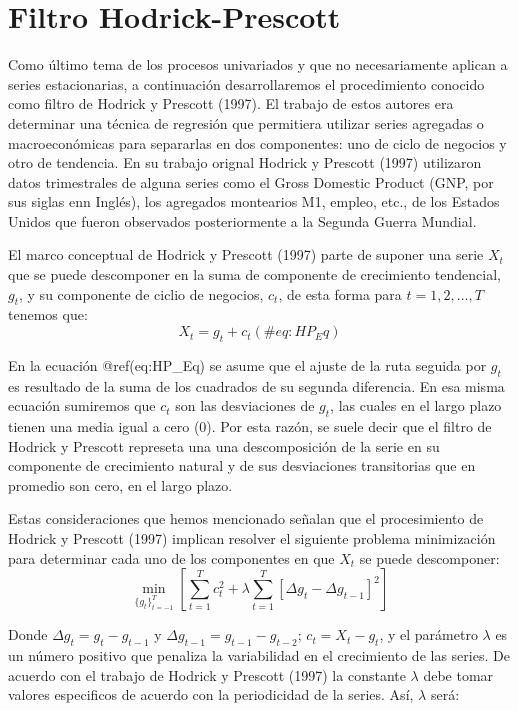 \documentclass[
]{book}
\begin{document}
\hypertarget{filtro-hodrick-prescott}{%
\section{Filtro Hodrick-Prescott}\label{filtro-hodrick-prescott}}

Como último tema de los procesos univariados y que no necesariamente aplican a series estacionarias, a continuación desarrollaremos el procedimiento conocido como filtro de Hodrick y Prescott (1997). El trabajo de estos autores era determinar una técnica de regresión que permitiera utilizar series agregadas o macroeconómicas para separarlas en dos componentes: uno de ciclo de negocios y otro de tendencia. En su trabajo orignal Hodrick y Prescott (1997) utilizaron datos trimestrales de alguna series como el Gross Domestic Product (GNP, por sus siglas enn Inglés), los agregados montearios M1, empleo, etc., de los Estados Unidos que fueron observados posteriormente a la Segunda Guerra Mundial.

El marco conceptual de Hodrick y Prescott (1997) parte de suponer una serie \(X_t\) que se puede descomponer en la suma de componente de crecimiento tendencial, \(g_t\), y su componente de ciclio de negocios, \(c_t\), de esta forma para \(t = 1, 2, \ldots, T\) tenemos que:
\begin{equation}
    X_t = g_t + c_t
    (\#eq:HP_Eq)
\end{equation}

En la ecuación @ref(eq:HP\_Eq) se asume que el ajuste de la ruta seguida por \(g_t\) es resultado de la suma de los cuadrados de su segunda diferencia. En esa misma ecuación sumiremos que \(c_t\) son las desviaciones de \(g_t\), las cuales en el largo plazo tienen una media igual a cero (0). Por esta razón, se suele decir que el filtro de Hodrick y Prescott represeta una una descomposición de la serie en su componente de crecimiento natural y de sus desviaciones transitorias que en promedio son cero, en el largo plazo.

Estas consideraciones que hemos mencionado señalan que el procesimiento de Hodrick y Prescott (1997) implican resolver el siguiente problema minimización para determinar cada uno de los componentes en que \(X_t\) se puede descomponer:
\begin{equation}
    \min_{\{ g_t \}^T_{t = -1} } \left[ \sum^T_{t = 1} c^2_t + \lambda \sum^T_{t = 1} [ \Delta g_t - \Delta g_{t-1}]^2 \right]
\end{equation}

Donde \(\Delta g_t = g_t - g_{t-1}\) y \(\Delta g_{t-1} = g_{t-1} - g_{t-2}\); \(c_t = X_t - g_t\), y el parámetro \(\lambda\) es un número positivo que penaliza la variabilidad en el crecimiento de las series. De acuerdo con el trabajo de Hodrick y Prescott (1997) la constante \(\lambda\) debe tomar valores especificos de acuerdo con la periodicidad de la series. Así, \(\lambda\) será:
\end{document}
